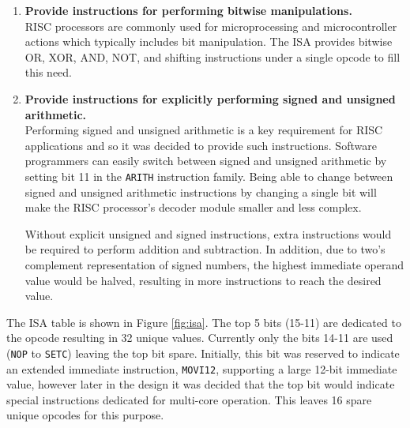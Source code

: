 \documentclass[11pt,a4paper]{report}
\begin{document}
{\begin{enumerate}[leftmargin=3\parindent, label=\bfseries ISA\arabic*., style=nextline]
{As shown in Figure \ref{fig:isa}, frequently used commands such as incrementing/decrementing and logical comparions are provided by setting spare bits to special values. For example, the instructions \verb|ARITH_UADDI| and \verb|ARITH_SSUBI| extend the \verb|ARITH_U| and \verb|ARITH_S| opcodes by filling the spare bit, 4. If this bit is not set (0), the instruction allows for a 4-bit immediate value to be added in addition to the two register selects. The 4-bit immediate allows adding a small number to the ALU which is useful in the case of software for loops where an increment/decrement of more than 1 is required.

Another example is the \verb|SETC| instruction. Inspired by Intel's x86 \verb|SETCC|, the instructions sets the destination register to zero or one depending on the result of the \verb|CMP| instruction's flags. Without this instruction, multiple branches would be required to convert the comparion's flags to logical zeros and ones.}\label{isa:freq}


\item{\textbf{Provide instructions for performing bitwise manipulations.}\\
RISC processors are commonly used for microprocessing and microcontroller actions which typically includes bit manipulation. The ISA provides bitwise OR, XOR, AND, NOT, and shifting instructions under a single opcode to fill this need.}\label{isa:bitwise}

\item{\textbf{Provide instructions for explicitly performing signed and unsigned arithmetic.}\\
Performing signed and unsigned arithmetic is a key requirement for RISC applications and so it was decided to provide such instructions. Software programmers can easily switch between signed and unsigned arithmetic by setting bit 11 in the \verb|ARITH| instruction family. Being able to change between signed and unsigned arithmetic instructions by changing a single bit will make the RISC processor's decoder module smaller and less complex.

Without explicit unsigned and signed instructions, extra instructions would be required to perform addition and subtraction. In addition, due to two's complement representation of signed numbers, the highest immediate operand value would be halved, resulting in more instructions to reach the desired value.
}\label{isa:signed}
\end{enumerate}

The ISA table is shown in Figure \ref{fig:isa}. The top 5 bits (15-11) are dedicated to the opcode resulting in 32 unique values. Currently only the bits 14-11 are used (\verb|NOP| to \verb|SETC|) leaving the top bit spare. Initially, this bit was reserved to indicate an extended immediate instruction, \verb|MOVI12|, supporting a large 12-bit immediate value, however later in the design it was decided that the top bit would indicate special instructions dedicated for multi-core operation. This leaves 16 spare unique opcodes for this purpose.

}
\end{document}
